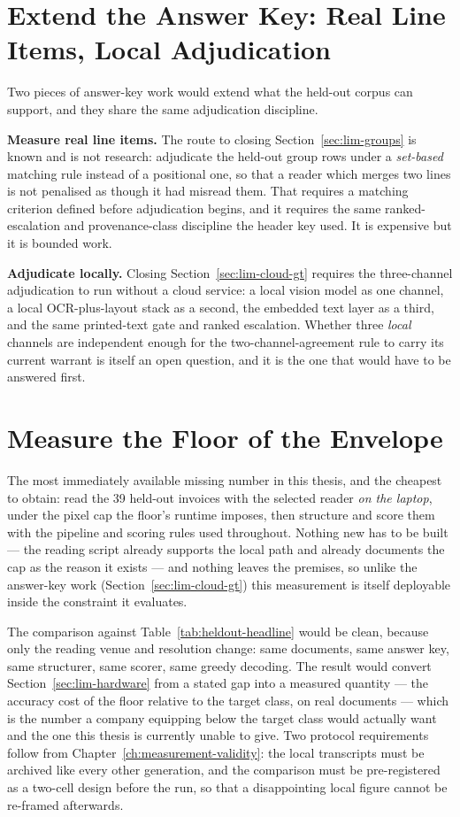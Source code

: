 \section{Extend the Answer Key: Real Line Items, Local Adjudication}
\label{sec:fw-local-gt}
\label{sec:fw-groups}

Two pieces of answer-key work would extend what the held-out corpus can support, and they
share the same adjudication discipline.

\textbf{Measure real line items.} The route to closing Section~\ref{sec:lim-groups} is known
and is not research: adjudicate the held-out group rows under a \emph{set-based} matching
rule instead of a positional one, so that a reader which merges two lines is not penalised
as though it had misread them. That requires a matching criterion defined before
adjudication begins, and it requires the same ranked-escalation and provenance-class
discipline the header key used. It is expensive but it is bounded work.

\textbf{Adjudicate locally.} Closing Section~\ref{sec:lim-cloud-gt} requires the three-channel
adjudication to run without a cloud
service: a local vision model as one channel, a local \ac{OCR}-plus-layout stack as a second, the
embedded text layer as a third, and the same printed-text gate and ranked escalation. Whether
three \emph{local} channels are independent enough for the two-channel-agreement rule to carry
its current warrant is itself an open question, and it is the one that would have to be answered
first.

\section{Measure the Floor of the Envelope}
\label{sec:fw-envelope}

The most immediately available missing number in this thesis, and the cheapest to obtain: read
the 39 held-out invoices with the selected reader \emph{on the laptop}, under the pixel cap the
floor's runtime imposes, then structure and score them with the pipeline and scoring rules used
throughout. Nothing new has to be built --- the reading script already supports the local path
and already documents the cap as the reason it exists --- and nothing leaves the premises, so
unlike the answer-key work (Section~\ref{sec:lim-cloud-gt}) this measurement is itself deployable
inside the constraint it evaluates.

The comparison against Table~\ref{tab:heldout-headline} would be clean, because only the
reading venue and resolution change: same documents, same answer key, same structurer, same
scorer, same greedy decoding. The result would convert Section~\ref{sec:lim-hardware} from a stated
gap into a measured quantity --- the accuracy cost of the floor relative to the target class,
on real documents --- which is the number a company equipping below the target class would
actually want and the one this thesis is currently unable to give. Two protocol requirements follow from
Chapter~\ref{ch:measurement-validity}: the local transcripts must be archived like every other
generation, and the comparison must be pre-registered as a two-cell design before the run, so
that a disappointing local figure cannot be re-framed afterwards.

